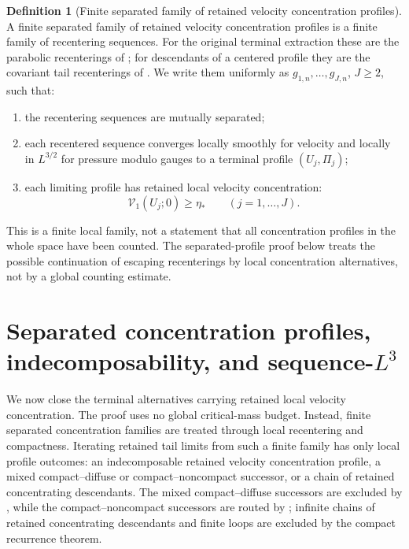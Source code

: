 \documentclass[11pt]{amsart}
\numberwithin{equation}{section}
\theoremstyle{plain}
\theoremstyle{definition}
\newtheorem{definition}[definition]{Definition}
\theoremstyle{remark}
\newcommand{\Vel}{\mathcal V}
\begin{document}
\begin{definition}[Finite separated family of retained velocity concentration profiles]
\label{def:finite-separated-profile-family}
A finite separated family of retained velocity concentration profiles is a finite
family of recentering sequences.  For the original terminal extraction these
are the parabolic recenterings of ; for
descendants of a centered profile they are the covariant tail recenterings of
.  We write them uniformly as
\(g_{1,n},\dots,g_{J,n}\), \(J\ge2\), such that:
\begin{enumerate}[label=(\roman*)]
   \item the recentering sequences are mutually separated;
   \item each recentered sequence converges locally smoothly for velocity and
   locally in \(L^{3/2}\) for pressure modulo gauges to a terminal profile
   \((U_j,\Pi_j)\);
   \item each limiting profile has retained local velocity concentration:
\[
   \Vel_1(U_j;0)\ge\eta_*
   \qquad (j=1,\dots,J).
\]
\end{enumerate}
This is a finite local family, not a statement that all concentration profiles
in the whole space have been counted.  The separated-profile proof below treats
the possible continuation of escaping recenterings by local concentration
alternatives, not by a global counting estimate.
\end{definition}

\section{Separated concentration profiles, indecomposability, and sequence-\texorpdfstring{\(L^3\)}{L3}}
\label{sec:separated-profiles-atomic}

We now close the terminal alternatives carrying retained local velocity concentration.
The proof uses no global critical-mass budget.  Instead, finite separated
concentration families are treated
through local recentering and compactness.  Iterating retained tail limits from
such a finite family has only local profile outcomes: an indecomposable
retained velocity concentration profile, a mixed compact--diffuse or compact--noncompact
successor, or a chain of retained concentrating descendants.  The mixed
compact--diffuse successors are excluded by ,
while the compact--noncompact successors are routed by
; infinite chains of retained concentrating descendants and finite
loops are excluded by the compact recurrence theorem.
\end{document}
